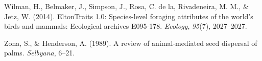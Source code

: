 \documentclass[
]{agujournal2019}
\newlength{\cslhangindent}
\newenvironment{CSLReferences}[2] %
 {\begin{list}{}{%
  \setlength{\itemindent}{0pt}
  \setlength{\leftmargin}{0pt}
  \setlength{\parsep}{0pt}
  \ifodd #1
   \setlength{\leftmargin}{\cslhangindent}
   \setlength{\itemindent}{-1\cslhangindent}
  \fi
  \setlength{\itemsep}{#2\baselineskip}}}
 {\end{list}}
\begin{document}
\begin{CSLReferences}{1}{0}
Wilman, H., Belmaker, J., Simpson, J., Rosa, C. de la, Rivadeneira, M.
M., \& Jetz, W. (2014). EltonTraits 1.0: Species-level foraging
attributes of the world's birds and mammals: Ecological archives
E095-178. \emph{Ecology}, \emph{95}(7), 2027--2027.

Zona, S., \& Henderson, A. (1989). A review of animal-mediated seed
dispersal of palms. \emph{Selbyana}, 6--21.

\end{CSLReferences}
\end{document}
